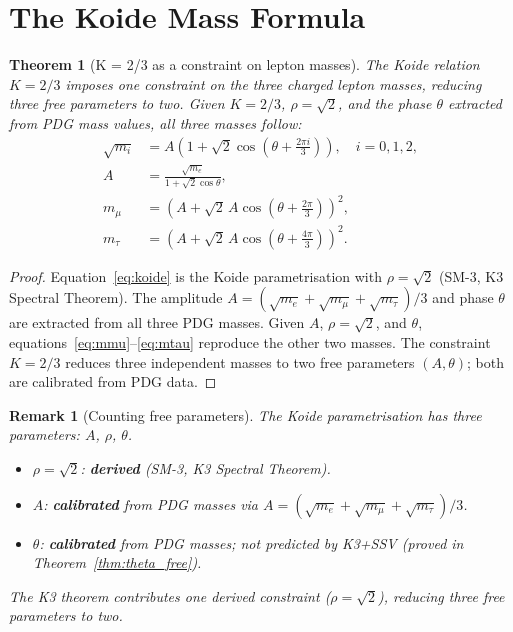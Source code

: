\documentclass[11pt]{article}
\newtheorem{theorem}{Theorem}[section]
\newtheorem{remark}{Remark}[section]
\begin{document}
\section{The Koide Mass Formula}

\begin{theorem}[K = 2/3 as a constraint on lepton masses]
\label{thm:masses}
The Koide relation $K = 2/3$ imposes one constraint on the three
charged lepton masses, reducing three free parameters to two.
Given $K = 2/3$, $\rho = \sqrt{2}$, and the phase $\theta$ extracted
from PDG mass values, all three masses follow:
\begin{align}
\sqrt{m_i} &= A\!\left(1 + \sqrt{2}\cos\!\left(\theta + \tfrac{2\pi i}{3}\right)\right),
\quad i = 0,1,2, \label{eq:koide}\\
A &= \frac{\sqrt{m_e}}{1+\sqrt{2}\cos\theta}, \label{eq:A}\\
m_\mu &= \left(A + \sqrt{2}\,A\cos\!\left(\theta+\tfrac{2\pi}{3}\right)\right)^2,
\label{eq:mmu}\\
m_\tau &= \left(A + \sqrt{2}\,A\cos\!\left(\theta+\tfrac{4\pi}{3}\right)\right)^2.
\label{eq:mtau}
\end{align}
\end{theorem}

\begin{proof}
Equation~\eqref{eq:koide} is the Koide parametrisation with $\rho = \sqrt{2}$
(SM-3, K3 Spectral Theorem).  The amplitude $A = (\sqrt{m_e}+\sqrt{m_\mu}+
\sqrt{m_\tau})/3$ and phase $\theta$ are extracted from all three PDG masses.
Given $A$, $\rho = \sqrt{2}$, and $\theta$, equations~\eqref{eq:mmu}--\eqref{eq:mtau}
reproduce the other two masses.  The constraint $K = 2/3$ reduces three
independent masses to two free parameters $(A, \theta)$; both are
calibrated from PDG data.
\end{proof}

\begin{remark}[Counting free parameters]
The Koide parametrisation has three parameters: $A$, $\rho$, $\theta$.
\begin{itemize}
\item $\rho = \sqrt{2}$: \textbf{derived} (SM-3, K3 Spectral Theorem).
\item $A$: \textbf{calibrated} from PDG masses via
  $A = (\sqrt{m_e}+\sqrt{m_\mu}+\sqrt{m_\tau})/3$.
\item $\theta$: \textbf{calibrated} from PDG masses; not predicted by
  K3+SSV (proved in Theorem~\ref{thm:theta_free}).
\end{itemize}
The K3 theorem contributes one derived constraint ($\rho = \sqrt{2}$),
reducing three free parameters to two.
\end{remark}
\end{document}
